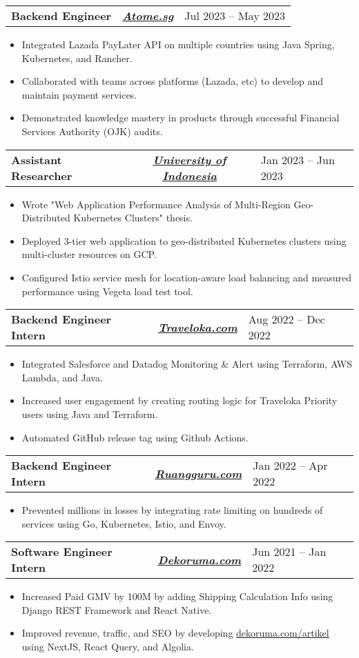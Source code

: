 \documentclass[letterpaper,11pt]{article}
\newcommand{\resumeItem}[1]{
  \item\small{
    {#1 \vspace{-3pt} }
  }
}
\newcommand{\resumeSubheading}[4]{
  \vspace{-2pt}\item

    \begin{tabularx}{\textwidth}{X c >{\raggedleft}X}

        \textbf{#1} & \textit{\textbf{#3}} & #2
    \end{tabularx}\vspace{-7pt}
}
\newcommand{\resumeItemListStart}{\begin{itemize}[leftmargin=0.15in]}
\newcommand{\resumeItemListEnd}{\end{itemize}\vspace{-5pt}}
\begin{document}
    \resumeSubheading
      {Backend Engineer} {Jul 2023 -- May 2023}
      {\href{https://www.atome.sg/}{Atome.sg}}{Jakarta, Indonesia}  
      \resumeItemListStart
        \resumeItem{Integrated Lazada PayLater API on multiple countries using Java Spring, Kubernetes, and Rancher.}
        \resumeItem{Collaborated with teams across platforms (Lazada, etc) to develop and maintain payment services.}
        \resumeItem{Demonstrated knowledge mastery in products through successful Financial Services Authority (OJK) audits.}
      \resumeItemListEnd

    \resumeSubheading
      {Assistant Researcher} {Jan 2023 -- Jun 2023}
      {\href{https://www.ui.ac.id/}{University of Indonesia}}{Jakarta, Indonesia}
      \resumeItemListStart
        \resumeItem{Wrote "Web Application Performance Analysis of Multi-Region Geo- Distributed Kubernetes Clusters" thesis.}
        \resumeItem{Deployed 3-tier web application to geo-distributed Kubernetes clusters using multi-cluster resources on GCP.}
        \resumeItem{Configured Istio service mesh for location-aware load balancing and measured performance using Vegeta load test tool.}
      \resumeItemListEnd
      
    \resumeSubheading
      {Backend Engineer Intern} {Aug 2022 -- Dec 2022}
      {\href{https://www.traveloka.com/}{Traveloka.com}}{Jakarta, Indonesia}
      \resumeItemListStart
        \resumeItem{Integrated Salesforce and Datadog Monitoring \& Alert using Terraform, AWS Lambda, and Java.}
        \resumeItem{Increased user engagement by creating routing logic for Traveloka Priority users using Java and Terraform.}
        \resumeItem{Automated GitHub release tag using Github Actions.}
      \resumeItemListEnd
      
    \resumeSubheading
      {Backend Engineer Intern} {Jan 2022 -- Apr 2022}
      {\href{https://www.ruangguru.com/}{Ruangguru.com}}{Jakarta, Indonesia}
      \resumeItemListStart
        \resumeItem{Prevented millions in losses by integrating rate limiting on hundreds of services using Go, Kubernetes, Istio, and Envoy.}
      \resumeItemListEnd

    \resumeSubheading
      {Software Engineer Intern} {Jun 2021 -- Jan 2022}
      {\href{https://dekoruma.com}{Dekoruma.com}}{Jakarta, Indonesia}
      \resumeItemListStart
        \resumeItem{Increased Paid GMV by 100M by adding Shipping Calculation Info using Django REST Framework and React Native.}
        \resumeItem{Improved revenue, traffic, and SEO by developing {\href{https://dekoruma.com/artikel}{dekoruma.com/artikel}} using NextJS, React Query, and Algolia.}
      \resumeItemListEnd
\end{document}
